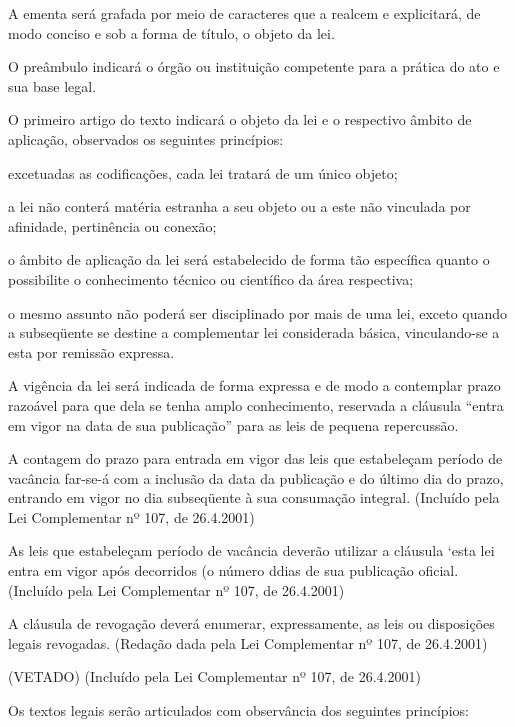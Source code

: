 \documentclass[calibri]{brlex2}
\begin{document}
\art A ementa será grafada por meio de caracteres que a realcem e explicitará, de modo conciso e sob a forma de título, o objeto da lei.

\art O preâmbulo indicará o órgão ou instituição competente para a prática do ato e sua base legal.


\art O primeiro artigo do texto indicará o objeto da lei e o respectivo âmbito de aplicação, observados os seguintes princípios:

\inc excetuadas as codificações, cada lei tratará de um único objeto;

\inc a lei não conterá matéria estranha a seu objeto ou a este não vinculada por afinidade, pertinência ou conexão;

\inc o âmbito de aplicação da lei será estabelecido de forma tão específica quanto o possibilite o conhecimento técnico ou científico da área respectiva;

\inc o mesmo assunto não poderá ser disciplinado por mais de uma lei, exceto quando a subseqüente se destine a complementar lei considerada básica, vinculando-se a esta por remissão expressa.

\art A vigência da lei será indicada de forma expressa e de modo a contemplar prazo razoável para que dela se tenha amplo conhecimento, reservada a cláusula ``entra em vigor na data de sua publicação'' para as leis de pequena repercussão.

\so A contagem do prazo para entrada em vigor das leis que estabeleçam período de vacância far-se-á com a inclusão da data da publicação e do último dia do prazo, entrando em vigor no dia subseqüente à sua consumação integral.    (Incluído pela Lei Complementar nº 107, de 26.4.2001)

\so As leis que estabeleçam período de vacância deverão utilizar a cláusula ‘esta lei entra em vigor após decorridos (o número d\alinea dias de sua publicação oficial.     (Incluído pela Lei Complementar nº 107, de 26.4.2001)

\art A cláusula de revogação deverá enumerar, expressamente, as leis ou disposições legais revogadas.    (Redação dada pela Lei Complementar nº 107, de 26.4.2001)

\parun (VETADO)     (Incluído pela Lei Complementar nº 107, de 26.4.2001)


\art Os textos legais serão articulados com observância dos seguintes princípios:
\end{document}
